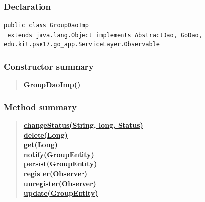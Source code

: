 \documentclass[11pt,a4paper]{report}
\begin{document}
{{{{{{{{{{{{\subsubsection{Declaration}{
\begin{lstlisting}[frame=none]
public class GroupDaoImp
 extends java.lang.Object implements AbstractDao, GoDao, edu.kit.pse17.go_app.ServiceLayer.Observable\end{lstlisting}
\subsubsection{Constructor summary}{
\begin{verse}
\hyperlink{edu.kit.pse17.go_app.PersistenceLayer.daos.GroupDaoImp()}{{\bf GroupDaoImp()}} \\
\end{verse}
}
\subsubsection{Method summary}{
\begin{verse}
\hyperlink{edu.kit.pse17.go_app.PersistenceLayer.daos.GroupDaoImp.changeStatus(java.lang.String, long, edu.kit.pse17.go_app.PersistenceLayer.Status)}{{\bf changeStatus(String, long, Status)}} \\
\hyperlink{edu.kit.pse17.go_app.PersistenceLayer.daos.GroupDaoImp.delete(java.lang.Long)}{{\bf delete(Long)}} \\
\hyperlink{edu.kit.pse17.go_app.PersistenceLayer.daos.GroupDaoImp.get(java.lang.Long)}{{\bf get(Long)}} \\
\hyperlink{edu.kit.pse17.go_app.PersistenceLayer.daos.GroupDaoImp.notify(edu.kit.pse17.go_app.PersistenceLayer.GroupEntity)}{{\bf notify(GroupEntity)}} \\
\hyperlink{edu.kit.pse17.go_app.PersistenceLayer.daos.GroupDaoImp.persist(edu.kit.pse17.go_app.PersistenceLayer.GroupEntity)}{{\bf persist(GroupEntity)}} \\
\hyperlink{edu.kit.pse17.go_app.PersistenceLayer.daos.GroupDaoImp.register(edu.kit.pse17.go_app.ServiceLayer.Observer)}{{\bf register(Observer)}} \\
\hyperlink{edu.kit.pse17.go_app.PersistenceLayer.daos.GroupDaoImp.unregister(edu.kit.pse17.go_app.ServiceLayer.Observer)}{{\bf unregister(Observer)}} \\
\hyperlink{edu.kit.pse17.go_app.PersistenceLayer.daos.GroupDaoImp.update(edu.kit.pse17.go_app.PersistenceLayer.GroupEntity)}{{\bf update(GroupEntity)}} \\
\end{verse}
}
}}}}}}}}}}}}}
\end{document}
